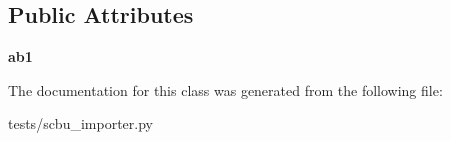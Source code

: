 \subsection*{Public Attributes}
\begin{DoxyCompactItemize}
\item 
\hypertarget{classtests_1_1scbu__importer_1_1_antibiogram__test_a5156a07f58edfa07ea7319bd87e8a0c9}{{\bfseries ab1}}\label{classtests_1_1scbu__importer_1_1_antibiogram__test_a5156a07f58edfa07ea7319bd87e8a0c9}

\end{DoxyCompactItemize}


The documentation for this class was generated from the following file\-:\begin{DoxyCompactItemize}
\item 
tests/scbu\-\_\-importer.\-py\end{DoxyCompactItemize}
